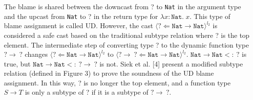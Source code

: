 The blame is shared between the downcast from ? to \texttt{Nat} in the argument type 
and the upcast from \texttt{Nat} to ? in the return type for $\lambda x \! : \! \texttt{Nat} . \; x$. 
This type of blame assignment is called UD. 
However, the cast $\langle ? \Leftarrow \texttt{Nat} \rightarrow \texttt{Nat} \rangle ^{l_2}$ 
is considered a safe cast based on the traditional subtype relation where 
? is the top element. The intermediate step of converting type ? to 
the dynamic function type $ ? \rightarrow \: ?$ changes $\langle ? \Leftarrow \texttt{Nat} 
\rightarrow \texttt{Nat} \rangle ^{l_2}$ to
$\langle ? \rightarrow \: ? \Leftarrow \texttt{Nat} \rightarrow \texttt{Nat} \rangle ^{l_2}$. 
$\texttt{Nat} \rightarrow \texttt{Nat} <: \: ?$ is true, but    
$\texttt{Nat} \rightarrow \texttt{Nat} <: \: ? \rightarrow \: ?$ is not. Siek et al. [4] 
present a modified subtype relation (defined in Figure 3) to prove the soundness of the UD 
blame assignment. In this way, ? is no longer the top element, and a function type $S \rightarrow T$ 
is only a subtype of ? if it is a subtype of $ ? \rightarrow \: ?$. 

